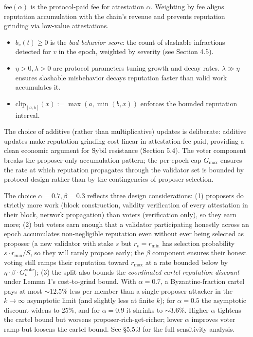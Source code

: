 \documentclass[
  11pt,
]{article}
\begin{document}
\(\text{fee}(\alpha)\) is the protocol-paid fee for attestation
\(\alpha\). Weighting by fee aligns reputation accumulation with the
chain's revenue and prevents reputation grinding via low-value
attestations.

\begin{itemize}
\item
  \(b_v(t) \geq 0\) is the \emph{bad behavior score}: the count of
  slashable infractions detected for \(v\) in the epoch, weighted by
  severity (see Section 4.5).
\item
  \(\eta > 0, \lambda > 0\) are protocol parameters tuning growth and
  decay rates. \(\lambda \gg \eta\) ensures slashable misbehavior decays
  reputation faster than valid work accumulates it.
\item
  \(\text{clip}_{[a,b]}(x) := \max(a, \min(b, x))\) enforces the bounded
  reputation interval.
\end{itemize}

The choice of additive (rather than multiplicative) updates is
deliberate: additive updates make reputation grinding cost linear in
attestation fee paid, providing a clean economic argument for Sybil
resistance (Section 5.4). The voter component breaks the proposer-only
accumulation pattern; the per-epoch cap \(G_{\max}\) ensures the rate at
which reputation propagates through the validator set is bounded by
protocol design rather than by the contingencies of proposer selection.

The choice \(\alpha = 0.7, \beta = 0.3\) reflects three design
considerations: (1) proposers do strictly more work (block construction,
validity verification of every attestation in their block, network
propagation) than voters (verification only), so they earn more; (2) but
voters earn enough that a validator participating honestly across an
epoch accumulates non-negligible reputation even without ever being
selected as proposer (a new validator with stake \(s\) but
\(r_v = r_{\min}\) has selection probability \(s \cdot r_{\min} / S\),
so they will rarely propose early; the \(\beta\) component ensures their
honest voting still ramps their reputation toward \(r_{\max}\) at a rate
bounded below by \(\eta \cdot \beta \cdot G_v^{\text{vote}}\)); (3) the
split also bounds the \emph{coordinated-cartel reputation discount}
under Lemma 1's cost-to-grind bound. With \(\alpha = 0.7\), a
Byzantine-fraction cartel pays at most \(\sim 12.5\%\) less per member
than a single-proposer attacker in the \(k \to \infty\) asymptotic limit
(and slightly less at finite \(k\)); for \(\alpha = 0.5\) the asymptotic
discount widens to \(25\%\), and for \(\alpha = 0.9\) it shrinks to
\(\sim 3.6\%\). Higher \(\alpha\) tightens the cartel bound but worsens
proposer-rich-get-richer; lower \(\alpha\) improves voter ramp but
loosens the cartel bound. See §5.5.3 for the full sensitivity analysis.
\end{document}
